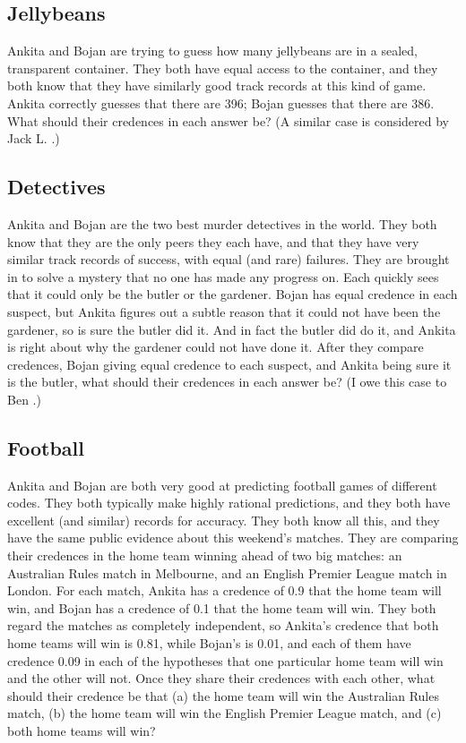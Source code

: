 \subsection{Jellybeans}
\label{jellybeans}

\gls{Ankita} and \gls{Bojan} are trying to guess how many jellybeans are in a sealed, transparent container. They both have equal access to the container, and they both know that they have similarly good track records at this kind of game. \gls{Ankita} correctly guesses that there are 396; \gls{Bojan} guesses that there are 386. What should their credences in each answer be? (A similar case is considered by Jack L. \citet{Treynor1987}.)

\subsection{Detectives}
\label{detectives}

\gls{Ankita} and \gls{Bojan} are the two best murder detectives in the world. They both know that they are the only peers they each have, and that they have very similar track records of success, with equal (and rare) failures. They are brought in to solve a mystery that no one has made any progress on. Each quickly sees that it could only be the butler or the gardener. \gls{Bojan} has equal credence in each suspect, but \gls{Ankita} figures out a subtle reason that it could not have been the gardener, so is sure the butler did it. And in fact the butler did do it, and \gls{Ankita} is right about why the gardener could not have done it. After they compare credences, \gls{Bojan} giving equal credence to each suspect, and \gls{Ankita} being sure it is the butler, what should their credences in each answer be? (I owe this case to Ben \citet{Levinstein2013}.)

\subsection{Football}
\label{football}

\gls{Ankita} and \gls{Bojan} are both very good at predicting football games of different codes. They both typically make highly rational predictions, and they both have excellent (and similar) records for accuracy. They both know all this, and they have the same public evidence about this weekend's matches. They are comparing their credences in the home team winning ahead of two big matches: an Australian Rules match in Melbourne, and an English Premier League match in London. For each match, \gls{Ankita} has a credence of 0.9 that the home team will win, and \gls{Bojan} has a credence of 0.1 that the home team will win. They both regard the matches as completely independent, so \gls{Ankita}'s credence that both home teams will win is 0.81, while \gls{Bojan}'s is 0.01, and each of them have credence 0.09 in each of the hypotheses that one particular home team will win and the other will not. Once they share their credences with each other, what should their credence be that (a) the home team will win the Australian Rules match, (b) the home team will win the English Premier League match, and (c) both home teams will win?

